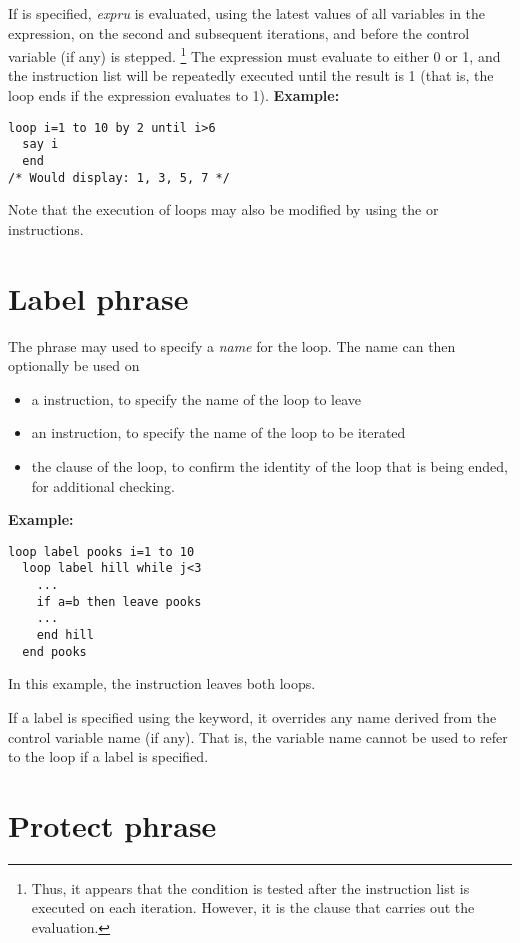\begin{description}
If  is specified, \emph{expru} is evaluated, using the
latest values of all variables in the expression, on the second and
subsequent iterations, and before the control variable (if any) is stepped.
\footnote{
Thus, it appears that the  condition is tested after the
instruction list is executed on each iteration.
However, it is the  clause that carries out the evaluation.
}
The expression must evaluate to either 0 or 1, and the instruction list
will be repeatedly executed until the result is 1 (that is, the loop
ends if the expression evaluates to 1).
 \textbf{Example:}
\begin{lstlisting}
loop i=1 to 10 by 2 until i>6
  say i
  end
/* Would display: 1, 3, 5, 7 */
\end{lstlisting}
\end{description}
 Note that the execution of loops may also be modified by
using the  or  instructions.
\section{Label phrase}
 
The  phrase may used to specify a \emph{name} for the
loop.  The name can then optionally be used on
\begin{itemize}
\item a  instruction, to specify the name of the loop to leave
\item an  instruction, to specify the name of the loop to
be iterated
\item the  clause of the loop, to confirm the identity of the
loop that is being ended, for additional checking.
\end{itemize}
 \textbf{Example:}
\begin{lstlisting}
loop label pooks i=1 to 10
  loop label hill while j<3
    ...
    if a=b then leave pooks
    ...
    end hill
  end pooks
\end{lstlisting}
In this example, the  instruction leaves both loops.
 
If a label is specified using the  keyword, it overrides
any name derived from the control variable name (if any).  That is, the
variable name cannot be used to refer to the loop if a label is
specified.
\section{Protect phrase}
 
